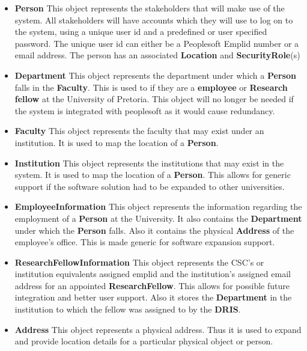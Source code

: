\documentclass[12pt]{article}
\begin{document}
\newpage
\begin{itemize}
\item \textbf{Person}
This object represents the stakeholders that will make use of the system. All stakeholders will have accounts which they will use to log on to the system, using a unique user id and a predefined or user specified password. The unique user id can either be a Peoplesoft Emplid number or a email address. The person has an associated \textbf{Location} and \textbf{SecurityRole}(s)

\item \textbf{Department}
This object represents the department under which a \textbf{Person} falls in the \textbf{Faculty}. This is used to if they are a \textbf{employee} or \textbf{Research fellow} at the University of Pretoria. This object will no longer be needed if the system is integrated with peoplesoft as it would cause redundancy.

\item \textbf{Faculty}
This object represents the faculty that may exist under an institution. It is used to map the location of a \textbf{Person}. 

\item \textbf{Institution}
This object represents the institutions that may exist in the system. It is used to map the location of a \textbf{Person}. This allows for generic support if the software solution had to be expanded to other universities.

\item \textbf{EmployeeInformation}
This object represents the information regarding the employment of a \textbf{Person} at the University. It also contains the \textbf{Department} under which the \textbf{Person} falls. Also it contains the physical \textbf{Address} of the employee's office. This is made generic for software expansion support.  

\item \textbf{ResearchFellowInformation}
This object represents the CSC's or institution equivalents assigned emplid and the institution's assigned email address for an appointed \textbf{ResearchFellow}. This allows for possible future integration and better user support. Also it stores the \textbf{Department} in the institution to which the fellow was assigned to by the \textbf{DRIS}.

\item \textbf{Address}
This object represents a physical address. Thus it is used to expand and provide location details for a particular physical object or person.  


\end{itemize}
\end{document}
